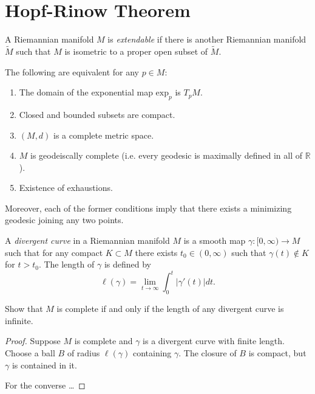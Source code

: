 \section{Hopf-Rinow Theorem}
\label{section-Hopf-Rinow-theorem}

\begin{definition}
\label{definition-non-extendable}
A Riemannian manifold $M$ is {\it extendable}
if there is another Riemannian manifold
$\tilde{M}$
such that $M$ is isometric to a proper open
subset of $\tilde{M}$.
\end{definition}

\begin{theorem}
\label{theorem-Hopf-Rinow}
The following are equivalent for any $p \in
M$:
\begin{enumerate}
\item The domain of the exponential map
$\text{exp}_p$ is $T_pM$.
\item Closed and bounded subsets are compact.
\item $(M,d)$ is a complete metric space.
\item $M$ is geodeiscally complete (i.e.
every geodesic is maximally defined in
all of $\mathbb{R}$).
\item Existence of exhaustions.
\end{enumerate}
Moreover, each of the former conditions imply
that there exists a minimizing
geodesic joining any two points.
\end{theorem}

\begin{exercise}
\label{exercise-divergent-curves}
\begin{reference}
\cite[Exercise 3.5, Chapter VII]{doc}
\end{reference}
A {\it divergent curve} in a Riemannian
manifold $M$
is a smooth map $\gamma:[0,\infty) \to M$
such that for any compact $K \subset M$
there exists $t_0\in(0,\infty)$
such that $\gamma(t) \not\in K$ for $t>t_0$.
The length of $\gamma$ is defined by
$$
\ell(\gamma)=\lim_{t \to \infty}
\int_0^t|\gamma'(t)|dt.
$$

Show that $M$ is complete if and only if
the length of any divergent curve is
infinite.
\end{exercise}

\begin{proof}
Suppose $M$ is complete and $\gamma$ is a
divergent curve
with finite length. Choose a ball $B$ of
radius $\ell(\gamma)$
containing $\gamma$. The closure of $B$ is
compact,
but $\gamma$ is contained in it.

For the converse …
\end{proof}

